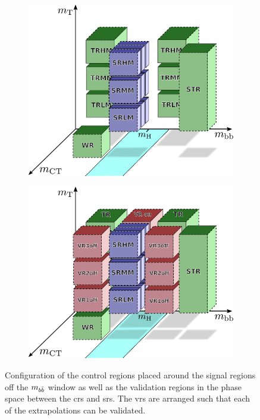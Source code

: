  \begin{figure}
	\centering
	\begin{subfigure}[b]{0.5\linewidth}
		\centering\includegraphics[width=1.0\textwidth]{strategy_5}
		\caption{\label{fig:cr_strategy}}
	\end{subfigure}\hfill
	\begin{subfigure}[b]{0.5\linewidth}
		\centering\includegraphics[width=1.0\textwidth]{strategy_7}
		\caption{\label{fig:vr_strategy}}
	\end{subfigure}\hfill

	\caption{Configuration of  the control regions placed around the signal regions off the $m_{b\bar{b}}$ window as well as  the validation regions in the phase space between the \glspl{cr} and \glspl{sr}. The \glspl{vr} are arranged such that each of the extrapolations can be validated.}
	\label{fig:results_HF_scans}
\end{figure}

